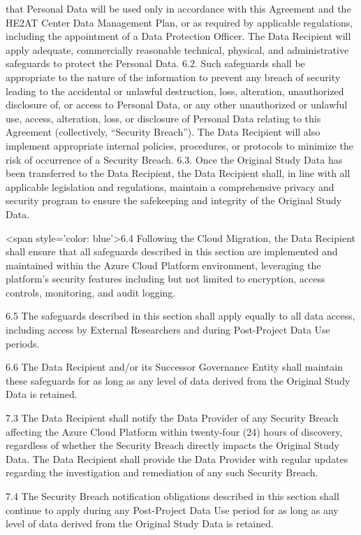 \documentclass[12pt,letterpaper]{article}
\begin{document}
that Personal Data will be used only in accordance with this Agreement and the HE2AT Center Data Management Plan, or as required by applicable regulations, including the appointment of a Data Protection Officer. The Data Recipient will apply adequate, commercially reasonable technical, physical, and administrative safeguards to protect the Personal Data. 6.2.	Such safeguards shall be appropriate to the nature of the information to prevent any breach of security leading to the accidental or unlawful destruction, loss, alteration, unauthorized disclosure of, or access to Personal Data, or any other unauthorized or unlawful use, access, alteration, loss, or disclosure of Personal Data relating to this Agreement (collectively, “Security Breach”). The Data Recipient will also implement appropriate internal policies, procedures, or protocols to minimize the risk of occurrence of a Security Breach. 6.3. Once the Original Study Data has been transferred to the Data Recipient, the Data Recipient shall, in line with all applicable legislation and regulations, maintain a comprehensive privacy and security program to ensure the safekeeping and integrity of the Original Study Data.

<span style='color: blue'>6.4 Following the Cloud Migration, the Data Recipient shall ensure that all safeguards described in this section are implemented and maintained within the Azure Cloud Platform environment, leveraging the platform's security features including but not limited to encryption, access controls, monitoring, and audit logging.

6.5 The safeguards described in this section shall apply equally to all data access, including access by External Researchers and during Post-Project Data Use periods.

6.6 The Data Recipient and/or its Successor Governance Entity shall maintain these safeguards for as long as any level of data derived from the Original Study Data is retained.

7.3 The Data Recipient shall notify the Data Provider of any Security Breach affecting the Azure Cloud Platform within twenty-four (24) hours of discovery, regardless of whether the Security Breach directly impacts the Original Study Data. The Data Recipient shall provide the Data Provider with regular updates regarding the investigation and remediation of any such Security Breach.

7.4 The Security Breach notification obligations described in this section shall continue to apply during any Post-Project Data Use period for as long as any level of data derived from the Original Study Data is retained.
\end{document}

